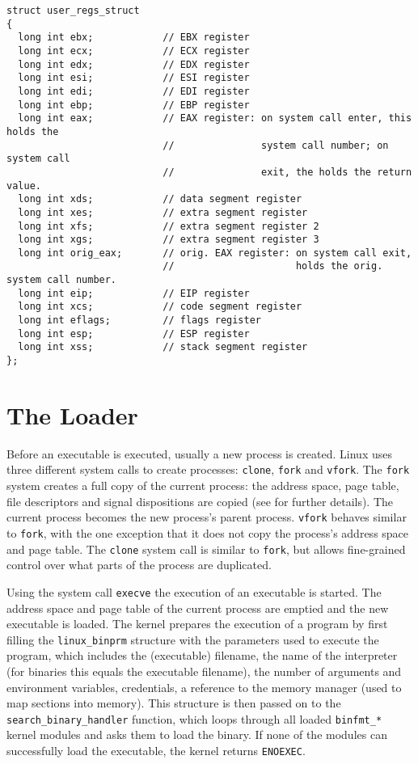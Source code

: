 \documentclass[draft,final]{vutinfth} %
\begin{document}
\begin{lstlisting}[caption={Definition of the 32-bit version of the \texttt{struct user\_regs\_struct} for reference}, label={lst:userregs}]
struct user_regs_struct
{
  long int ebx;            // EBX register
  long int ecx;            // ECX register
  long int edx;            // EDX register
  long int esi;            // ESI register
  long int edi;            // EDI register
  long int ebp;            // EBP register
  long int eax;            // EAX register: on system call enter, this holds the
                           //               system call number; on system call
                           //               exit, the holds the return value.
  long int xds;            // data segment register
  long int xes;            // extra segment register
  long int xfs;            // extra segment register 2
  long int xgs;            // extra segment register 3
  long int orig_eax;       // orig. EAX register: on system call exit,
                           //                     holds the orig. system call number.
  long int eip;            // EIP register
  long int xcs;            // code segment register
  long int eflags;         // flags register
  long int esp;            // ESP register
  long int xss;            // stack segment register
};
\end{lstlisting}

\section{The Loader}
\label{loader}

Before an executable is executed, usually a new process is created. Linux uses three different system calls to create processes: \texttt{clone}, \texttt{fork} and \texttt{vfork}. The \texttt{fork} system creates a full copy of the current process: the address space, page table, file descriptors and signal dispositions are copied (see \cite{ForkManPage} for further details). The current process becomes the new process's parent process. \texttt{vfork} behaves similar to \texttt{fork}, with the one exception that it does not copy the process's address space and page table. The \texttt{clone} system call is similar to \texttt{fork}, but allows fine-grained control over what parts of the process are duplicated.

Using the system call \texttt{execve} the execution of an executable is started. The address space and page table of the current process are emptied and the new executable is loaded. The kernel prepares the execution of a program by first filling the \texttt{linux\_binprm} structure with the parameters used to execute the program, which includes the (executable) filename, the name of the interpreter (for binaries this equals the executable filename), the number of arguments and environment variables, credentials, a reference to the memory manager (used to map sections into memory). This structure is then passed on to the \texttt{search\_binary\_handler} function, which loops through all loaded \texttt{binfmt\_*} kernel modules and asks them to load the binary. If none of the modules can successfully load the executable, the kernel returns \texttt{ENOEXEC}.
\end{document}
